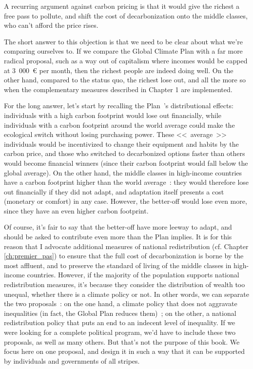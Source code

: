 \documentclass[a5paper,french,openany]{memoir}
\begin{document}
{A recurring argument against carbon pricing is that it would give the richest a free pass to pollute, and shift the cost of decarbonization onto the middle classes, who can't afford the price rises. 

The short answer to this objection is that we need to be clear about what we're comparing ourselves to. If we compare the Global Climate Plan with a far more radical proposal, such as a way out of capitalism where incomes would be capped at 3~000~\euro{} per month, then the richest people are indeed doing well. On the other hand, compared to the status quo, the richest lose out, and all the more so when the complementary measures described in Chapter 1 are implemented. 

For the long answer, let's start by recalling the Plan~'s distributional effects: individuals with a high carbon footprint would lose out financially, while individuals with a carbon footprint around the world average could make the ecological switch without losing purchasing power. These <<~average~>> individuals would be incentivized to change their equipment and habits by the carbon price, and those who switched to decarbonized options faster than others would become financial winners (since their carbon footprint would fall below the global average). On the other hand, the middle classes in high-income countries have a carbon footprint higher than the world average~: they would therefore lose out financially if they did not adapt, and adaptation itself presents a cost (monetary or comfort) in any case. However, the better-off would lose even more, since they have an even higher carbon footprint. 

Of course, it's fair to say that the better-off have more leeway to adapt, and should be asked to contribute even more than the Plan implies. It is for this reason that I advocate additional measures of national redistribution (cf. Chapter \ref{ch:premier_pas}) to ensure that the full cost of decarbonization is borne by the most affluent, and to preserve the standard of living of the middle classes in high-income countries. However, if the majority of the population supports national redistribution measures, it's because they consider the distribution of wealth too unequal, whether there is a climate policy or not. In other words, we can separate the two proposals~: on the one hand, a climate policy that does not aggravate inequalities (in fact, the Global Plan reduces them)~; on the other, a national redistribution policy that puts an end to an indecent level of inequality. If we were looking for a complete political program, we'd have to include these two proposals, as well as many others. But that's not the purpose of this book. We focus here on one proposal, and design it in such a way that it can be supported by individuals and governments of all stripes. 

}
\end{document}
